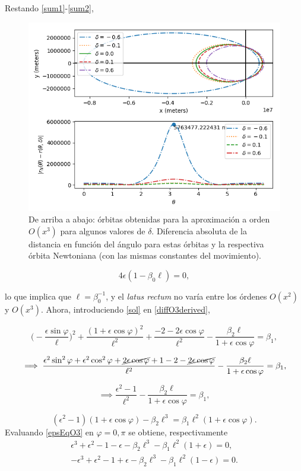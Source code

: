 \documentclass{article}
\begin{document}
Restando \eqref{sum1}-\eqref{sum2}, 
\begin{figure}
	\centering
	\includegraphics[width=.7\textwidth]{../orbits3.png}
	\caption{De arriba a abajo: órbitas obtenidas para la aproximación a orden $O(x^3)$ para algunos valores de $\delta$. Diferencia absoluta de la distancia en función del ángulo para estas órbitas y la respectiva órbita Newtoniana (con las mismas constantes del movimiento).}
	\label{fig:orbitas3}
\end{figure}

$$4\epsilon(1-\beta_0\ell)=0,$$

lo que implica que $\ell=\beta_0^{-1}$, y el \textit{latus rectum} no varía entre los órdenes $O(x^2)$ y $O(x^3).$ Ahora, introduciendo \eqref{sol} en \eqref{diffO3derived},

$$\Big(-\frac{\epsilon\sin\varphi}{\ell}\Big)^2+\frac{(1+\epsilon\cos\varphi)^2}{\ell^2}+\frac{-2-2\epsilon\cos\varphi}{\ell^2}-\frac{\beta_2\ell}{1+\epsilon\cos\varphi}=\beta_1,$$

$$\implies \frac{\epsilon^2\sin^2\varphi+\epsilon^2\cos^2\varphi+\cancel{2\epsilon\cos\varphi}+1-2-\cancel{2\epsilon\cos\varphi}}{\ell^2}-\frac{\beta_2\ell}{1+\epsilon\cos\varphi}=\beta_1,$$

$$\implies \frac{\epsilon^2-1}{\ell^2}-\frac{\beta_2\ell}{1+\epsilon\cos\varphi}=\beta_1,$$

\begin{equation}\label{epsEqO3}
	(\epsilon^2-1)(1+\epsilon\cos\varphi)-\beta_2\ell^3=\beta_1\ell^2(1+\epsilon\cos\varphi).
\end{equation}
Evaluando \eqref{epsEqO3} en $\varphi=0,\pi$ se obtiene, respectivamente
\begin{gather}
	\epsilon^3+\epsilon^2-1-\epsilon-\beta_2\ell^3-\beta_1\ell^2(1+\epsilon)=0\label{oneEps},\\
	-\epsilon^3+\epsilon^2-1+\epsilon-\beta_2\ell^3-\beta_1\ell^2(1-\epsilon)=0\label{twoEps}.
\end{gather}
\end{document}
